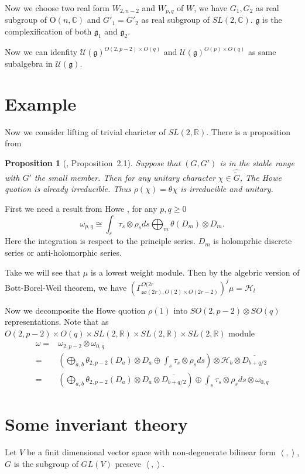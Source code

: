 \documentclass[12pt]{article}
\newtheorem{prop}{Proposition}
\def\bR{{\mathbb{R}}}
\def\bC{{\mathbb{C}}}
\def\inn#1#2{\left\langle{#1},{#2}\right\rangle}
\def\aso{\mathfrak{so}}
\def\fgg{\mathfrak{g}}
\def\chh{\mathcal{H}}
\def\cuu{\mathcal{U}}
\def\OO{\mathrm{O}}
\begin{document}
Now we choose two real form $W_{2,n-2}$ and $W_{p,q}$ of $W$, we have
$G_1, G_2$ as real subgroup of $\OO(n,\bC)$ and $G'_1=G'_2$ as real subgroup 
of $SL(2,\bC)$. $\fgg$ is the complexification of both $\fgg_1$ and $\fgg_2$. 

Now we can idenfity $\cuu(\fgg)^{O(2,p-2)\times O(q)}$ and
$\cuu(\fgg)^{O(p)\times O(q)}$ as same subalgebra in $\cuu(\fgg)$.



\section{Example }
Now we consider lifting of trivial charicter of $SL(2,\bR)$.
There is a proposition from \cite{ZhuHuang1997}
\begin{prop}[\cite{ZhuHuang1997}, Proposition~2.1]
Suppose that $(G,G')$ is in the stable range with $G'$ the small member. 
Then for any unitary character $\chi\in \widehat{\tilde{G}}$, 
The Howe quotion is already irreducible. Thus $\rho(\chi)=\theta{\chi}$
is irreducible and unitary.
\end{prop} 

First we need a result from Howe \cite{Howe1979Opq}, for any $p,q\geq 0$
\[
\omega_{p,q}\cong \int_{s} \tau_s\otimes \rho_s ds \bigoplus_m \theta(D_m)\otimes D_m.
\]
Here the integration is respect to the principle series. $D_m$ is holomprhic 
discrete series or anti-holomorphic series. 

Take 
 we will see that $\mu$ is a lowest 
weight module. Then by the algebric version of Bott-Borel-Weil theorem, 
we have $(\Gamma_{\aso(2r),O(2)\times O(2r-2)}^{O(2r})^j \mu = \chh_l$


Now we decomposite the Howe quotion $\rho(1)$ into $SO(2,p-2)\otimes SO(q)$ representations.
Note that as $O(2,p-2)\times O(q)\times SL(2,\bR)\times SL(2,\bR)\times SL(2,\bR)$ module
\[
\begin{split}
\omega =& \omega_{2,p-2}\otimes \omega_{0,q}\\
=& \left(\bigoplus_{a,b} \theta_{2,p-2}(D_a)\otimes D_a 
\oplus \int_s\tau_s\otimes \rho_s ds \right) \otimes \chh_b 
\otimes \overline{D_{b+q/2}}\\ 
=&\left(\bigoplus_{a,b}  \theta_{2,p-2}(D_a)\otimes D_a \otimes \overline{D_{b+q/2}}
\right)\oplus \int_s\tau_s\otimes \rho_s ds \otimes \omega_{0,q}
\end{split}
\]



\appendix
\section{Some inveriant theory}
Let $V$ be a finit dimensional  vector space 
with non-degenerate bilinear form $\inn{}{}$, 
$G$ is the subgroup of $GL(V)$ preseve $\inn{}{}$. 
\end{document}
